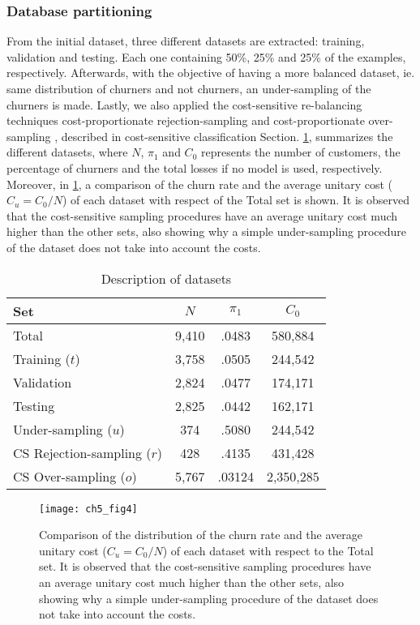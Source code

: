 	\subsubsection{Database partitioning}
	From the initial dataset, three different datasets are extracted: training, validation and 
  testing. Each one containing 50\%, 25\% and 25\% of the examples, respectively.   
  Afterwards, with the objective of having a more balanced dataset, ie. same distribution of 
	churners and not churners, an under-sampling of the churners is made.     
  Lastly, we also applied the cost-sensitive re-balancing techniques cost-proportionate 
	rejection-sampling \citep{Zadrozny2003} and cost-proportionate over-sampling \citep{Elkan2001}, 
	described in cost-sensitive classification Section.
	\tablename{ \ref{table_trainandtest}}, summarizes the different datasets, where $N$, $\pi_1$ 
and $C_0$ represents the number of customers, the percentage of churners and the total losses if no 
model is used, respectively. Moreover, in \figurename{ \ref{fig:ch5:4}}, a comparison of the 
churn rate 
and the average unitary cost ($C_u=C_0 / N$) of each dataset with respect of the Total set is shown.
It is observed that the cost-sensitive sampling procedures have an average unitary cost much higher 
than the other sets, also showing why a simple under-sampling procedure of the dataset does not 
take into account the costs.

  \begin{table}[t!]
    \caption{Description of datasets}
    \label{table_trainandtest}
    \centering
    \begin{tabular}{l c c c } %
		\\ \hline
		Set&	$N$ &	$\pi_1$ & $C_0$ \\
		\hline
		Total&9,410&.0483&580,884\\
		Training ($t$)&3,758&.0505&244,542\\
		Validation&2,824&.0477&174,171\\
		Testing&2,825&.0442&162,171\\
		Under-sampling ($u$)&374&.5080&244,542\\
		CS Rejection-sampling ($r$)&428&.4135&431,428\\
		CS Over-sampling ($o$)&5,767&.03124&2,350,285\\
	  \hline
	  \end{tabular}
  \end{table}

	\begin{figure}[t!]
	  \centering
    \texttt{[image: ch5\_fig4]}
	  \caption{Comparison of the distribution of the churn rate and the average unitary cost 
	  ($C_u=C_0 / N$) of each dataset with respect to the Total set.
It is observed that the cost-sensitive sampling procedures have an average unitary cost much higher 
than the other sets, also showing why a simple under-sampling procedure of the dataset does not 
take into account the costs.}
	  \label{fig:ch5:4}
	\end{figure}


